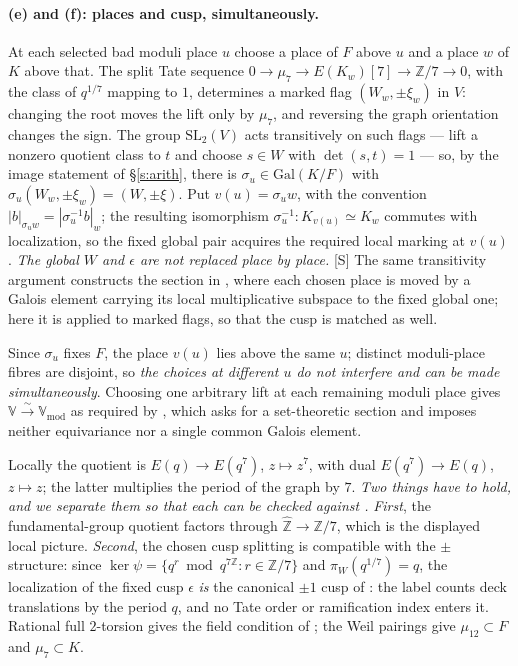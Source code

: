 \documentclass[11pt]{article}
\theoremstyle{plain}
\theoremstyle{definition}
\newcommand{\Vmod}{\mathbb{V}_{\mathrm{mod}}}
\newcommand{\VV}{\mathbb{V}}
\begin{document}
\paragraph{(e) and (f): places and cusp, simultaneously.}
At each selected bad moduli place $u$ choose a place of $F$ above $u$ and a place
$w$ of $K$ above that.  The split Tate sequence
$0\to\mu_7\to E(K_w)[7]\to\mathbb Z/7\to0$, with the class of $q^{1/7}$ mapping to
$1$, determines a marked flag $(W_w,\pm\xi_w)$ in $V$: changing the root moves the
lift only by $\mu_7$, and reversing the graph orientation changes the sign.  The
group $\mathrm{SL}_2(V)$ acts transitively on such flags --- lift a nonzero
quotient class to $t$ and choose $s\in W$ with $\det(s,t)=1$ --- so, by the image
statement of \S\ref{s:arith}, there is $\sigma_u\in\mathrm{Gal}(K/F)$ with
$\sigma_u(W_w,\pm\xi_w)=(W,\pm\xi)$.  Put $v(u)=\sigma_u w$, with the convention
$|b|_{\sigma_u w}=|\sigma_u^{-1}b|_w$; the resulting isomorphism
$\sigma_u^{-1}:K_{v(u)}\simeq K_w$ commutes with localization, so the fixed global
pair acquires the required local marking at $v(u)$.  \emph{The global $W$ and
$\epsilon$ are not replaced place by place.}  \textup{[S]} The same transitivity
argument constructs the section in \cite[Lemma~2.9.2]{DH25}, where each chosen place
is moved by a Galois element carrying its local multiplicative subspace to the fixed
global one; here it is applied to marked flags, so that the cusp is matched as well.

Since $\sigma_u$ fixes $F$, the place $v(u)$ lies above the same $u$; distinct
moduli-place fibres are disjoint, so \emph{the choices at different $u$ do not
interfere and can be made simultaneously}.  Choosing one arbitrary lift at each
remaining moduli place gives $\VV\xrightarrow{\ \sim\ }\Vmod$ as required by
\cite[Def.~3.1(e)]{IUT1}, which asks for a set-theoretic section and imposes
neither equivariance nor a single common Galois element.

Locally the quotient is $E(q)\to E(q^7)$, $z\mapsto z^7$, with dual
$E(q^7)\to E(q)$, $z\mapsto z$; the latter multiplies the period of the graph by
$7$.  \emph{Two things have to hold, and we separate them so that each can be checked
against \cite[Def.~2.5]{EtTh}.}  \emph{First}, the fundamental-group quotient factors
through $\widehat{\mathbb Z}\to\mathbb Z/7$, which is the displayed local picture.
\emph{Second}, the chosen cusp splitting is compatible with the $\pm$ structure: since
$\ker\psi=\{q^r\bmod q^{7\mathbb Z}:r\in\mathbb Z/7\}$ and $\pi_W(q^{1/7})=q$, the
localization of the fixed cusp $\epsilon$ \emph{is} the canonical $\pm1$ cusp of
\cite[Def.~3.1(f)]{IUT1}: the label counts deck translations by the period $q$,
and no Tate order or ramification index enters it.  Rational full $2$-torsion gives
the field condition of \cite[Def.~3.1(e)]{IUT1}; the Weil pairings give
$\mu_{12}\subset F$ and $\mu_7\subset K$.
\end{document}
